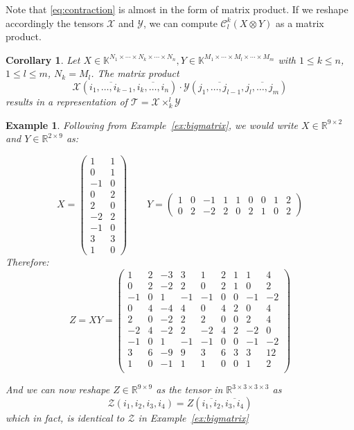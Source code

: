 \documentclass[11pt,a4paper,openright,oneside]{book}
\numberwithin{equation}{section}
\newtheorem{corollary0}[defn0]{Corollary}
\newtheorem{example0}[defn0]{Example}
\newenvironment{corollary}{\bigskip \begin{corollary0}}{\end{corollary0}}
\newenvironment{example}{ \begin{example0}\rm}{\end{example0}}
\newcommand{\exref}[1]{Example~\ref{#1}}
\newcommand{\refeq}[1]{\cref{#1}}
\begin{document}
Note that \refeq{eq:contraction} is almost in the form of matrix product. If we reshape accordingly
the tensors $\mathcal{X}$ and $\mathcal{Y}$, we can compute $\mathcal{C}_l^k(X \otimes Y)$ as a matrix product.
\begin{corollary}
    Let $X \in \mathbb{K}^{N_1 \times \cdots \times N_k \times \cdots \times N_n}, Y \in \mathbb{K}^{M_1 \times \cdots \times M_l \times \cdots \times M_m}$
    with $1 \leqslant k \leqslant n$, $1 \leqslant l \leqslant m$, $N_k = M_l$. The matrix product
$$ \mathcal{X}(\overline{i_1, \dots, i_{k-1}}, \overline{i_k, \dots, i_n}) \cdot \mathcal{Y}(\overline{j_1, \dots, j_{l-1}}, \overline{j_l, \dots, j_m}) $$
    results in a representation of $\mathcal{T} = \mathcal{X} \times_k^l \mathcal{Y}$
\end{corollary}

\begin{example}
    Following from \exref{ex:bigmatrix}, we would write $X \in \mathbb{R}^{9 \times 2}$ and $Y \in \mathbb{R}^{2 \times 9}$ as:

    $$X = \begin{pmatrix}
        1 & 1 \\ 0 & 1 \\ -1 & 0 \\ 0 & 2 \\ 2 & 0 \\ -2 & 2 \\ -1 & 0 \\ 3 & 3 \\ 1 & 0
        \end{pmatrix} \qquad
        Y = \begin{pmatrix}
            1 & 0 & -1 & 1 & 1 & 0 & 0 & 1 & 2 \\
            0 & 2 & -2 & 2 & 0 & 2 & 1 & 0 & 2
        \end{pmatrix}$$
        Therefore:
    $$Z = XY = \begin{pmatrix}
        1&	2&	-3&	 3&	 1&	2&	1&	 1&	 4\\
        0&	2&	-2&	 2&	 0&	2&	1&	 0&	 2\\
        -1&	0&	 1&	-1&	-1&	0&	0&	-1&	-2\\
        0&	4&	-4&	 4&	 0&	4&	2&	 0&	 4\\
        2&	0&	-2&	 2&	 2&	0&	0&	 2&	 4\\
        -2&	4&	-2&	 2&	-2&	4&	2&	-2&	 0\\
        -1&	0&	 1&	-1&	-1&	0&	0&	-1&	-2\\
        3&	6&	-9&	 9&	 3&	6&	3&	 3&	12\\
        1&	0&	-1&	 1&	 1&	0&	0&	 1&	 2\\
    \end{pmatrix}$$

    And we can now reshape $Z \in \mathbb{R}^{9 \times 9}$ as the tensor in $\mathbb{R}^{3\times 3\times 3\times 3}$
    as $$\mathcal{Z}(i_1, i_2, i_3, i_4) = Z(\overline{i_1, i_2}, \overline{i_3, i_4})$$
    which in fact, is identical to $\mathcal{Z}$ in \exref{ex:bigmatrix}
\end{example}
\end{document}
